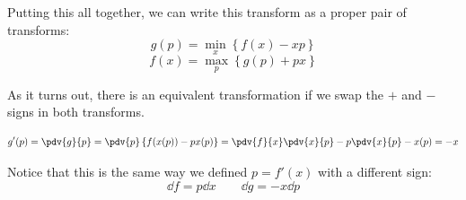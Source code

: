 \documentclass[a4paper,twoside,master.tex]{subfiles}
\begin{document}
Putting this all together, we can write this transform as a proper pair of transforms:
\begin{equation}
    g(p) = \min_x\left\{ f(x) - xp \right\}
\end{equation}
\begin{equation}
    f(x) = \max_p\left\{ g(p) + px \right\}
\end{equation}

As it turns out, there is an equivalent transformation if we swap the $ + $ and $ - $ signs in both transforms.

\begin{equation}
    g'(p) = \pdv{g}{p} = \pdv{p}\left\{ f(x(p)) - px(p) \right\} = \pdv{f}{x} \pdv{x}{p} - p \pdv{x}{p} - x(p) = - x
\end{equation}

Notice that this is the same way we defined $ p = f'(x) $ with a different sign:
\begin{equation}
    \dd{f} = p \dd{x} \qquad \dd{g} = - x \dd{p}
\end{equation}
\end{document}

